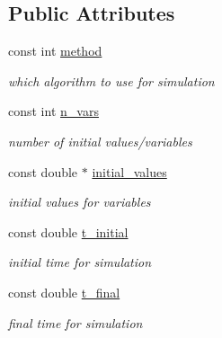 \subsection*{Public Attributes}
\begin{DoxyCompactItemize}
\item 
\mbox{\label{class_paramset_a67376577973f825ba60fc7c319ccc906}} 
const int \hyperlink{class_paramset_a67376577973f825ba60fc7c319ccc906}{method}
\begin{DoxyCompactList}\small\item\em which algorithm to use for simulation \end{DoxyCompactList}\item 
\mbox{\label{class_paramset_aee56c5dcf7d40836397965cdcf392343}} 
const int \hyperlink{class_paramset_aee56c5dcf7d40836397965cdcf392343}{n\+\_\+vars}
\begin{DoxyCompactList}\small\item\em number of initial values/variables \end{DoxyCompactList}\item 
\mbox{\label{class_paramset_aae7232620d4a9c0bbf30b12c37610c1e}} 
const double $\ast$ \hyperlink{class_paramset_aae7232620d4a9c0bbf30b12c37610c1e}{initial\+\_\+values}
\begin{DoxyCompactList}\small\item\em initial values for variables \end{DoxyCompactList}\item 
\mbox{\label{class_paramset_a7d82a76c08567e5072aa1b125708c7d8}} 
const double \hyperlink{class_paramset_a7d82a76c08567e5072aa1b125708c7d8}{t\+\_\+initial}
\begin{DoxyCompactList}\small\item\em initial time for simulation \end{DoxyCompactList}\item 
\mbox{\label{class_paramset_ac88cde461d8dbbd8a7d2636fc45f7119}} 
const double \hyperlink{class_paramset_ac88cde461d8dbbd8a7d2636fc45f7119}{t\+\_\+final}
\begin{DoxyCompactList}\small\item\em final time for simulation \end{DoxyCompactList}\item 

\end{DoxyCompactItemize}
